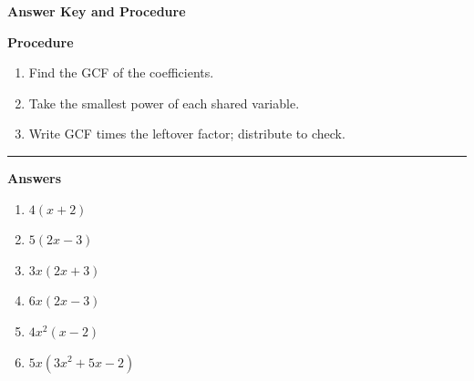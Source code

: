 \documentclass[12pt]{article}
\begin{document}
\begin{center}{\Large \textbf{Answer Key and Procedure}}\end{center}
\vspace{0.3cm}
\textbf{Procedure}
\begin{enumerate}
  \item Find the GCF of the coefficients.
  \item Take the smallest power of each shared variable.
  \item Write GCF times the leftover factor; distribute to check.
\end{enumerate}
\vspace{0.4cm}\hrule\vspace{0.4cm}
\textbf{Answers}
\begin{enumerate}[label=\textbf{\arabic*.}]
  \item $4(x+2)$
  \item $5(2x-3)$
  \item $3x(2x+3)$
  \item $6x(2x-3)$
  \item $4x^{2}(x-2)$
  \item $5x(3x^{2}+5x-2)$
\end{enumerate}
\end{document}
